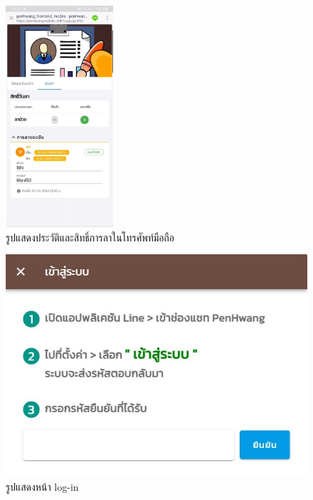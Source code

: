 \begin{figure}
  \begin{center}
    \includegraphics[width=4cm,keepaspectratio]{./images/line_leave_history.jpg}
  \end{center}
  \caption[รูปแสดงประวัติและสิทธิ์การลาในโทรศัพท์มือถือ]{รูปแสดงประวัติและสิทธิ์การลาในโทรศัพท์มือถือ} 
  \label{fig:line_leave_history}
\end{figure}

\begin{figure}
  \begin{center}
    \includegraphics[width=14cm,keepaspectratio]{./images/login.jpg}
  \end{center}
  \caption[รูปแสดงหน้า log-in]{รูปแสดงหน้า log-in} 
  \label{fig:login}
\end{figure}

